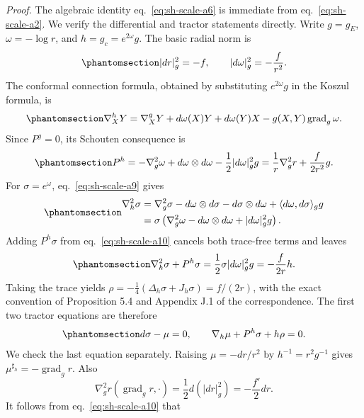 \documentclass[
  english,
  11pt,
  reqno]{amsart}
\begin{document}
\emph{Proof.} The algebraic identity eq.~\ref{eq:sh-scale-a6} is
immediate from eq.~\ref{eq:sh-scale-a2}. We verify the differential and
tractor statements directly. Write \(g=g_E\), \(\omega=-\log r\), and
\(h=g_c=e^{2\omega}g\). The basic radial norm is
\begin{equation}\protect\phantomsection\label{eq:sh-scale-a8}{
|dr|_g^2=-f,\qquad |d\omega|_g^2=-\frac f{r^2}.
}\end{equation} The conformal connection formula, obtained by
substituting \(e^{2\omega}g\) in the Koszul formula, is
\begin{equation}\protect\phantomsection\label{eq:sh-scale-a9}{
\nabla^h_XY=\nabla^g_XY+d\omega(X)Y+d\omega(Y)X
-g(X,Y)\operatorname{grad}_g\omega.
}\end{equation} Since \(P^g=0\), its Schouten consequence is
\begin{equation}\protect\phantomsection\label{eq:sh-scale-a10}{
P^h=-\nabla_g^2\omega+d\omega\otimes d\omega
-\frac12|d\omega|_g^2g
=\frac1r\nabla_g^2r+\frac f{2r^2}g.
}\end{equation} For \(\sigma=e^\omega\), eq.~\ref{eq:sh-scale-a9} gives
\begin{equation}\protect\phantomsection\label{eq:sh-scale-a11}{
\begin{aligned}
\nabla_h^2\sigma
&=\nabla_g^2\sigma-d\omega\otimes d\sigma-d\sigma\otimes d\omega
+\langle d\omega,d\sigma\rangle_g g\\
&=\sigma\left(\nabla_g^2\omega-d\omega\otimes d\omega
+|d\omega|_g^2g\right).
\end{aligned}
}\end{equation} Adding \(P^h\sigma\) from eq.~\ref{eq:sh-scale-a10}
cancels both trace-free terms and leaves
\begin{equation}\protect\phantomsection\label{eq:sh-scale-a12}{
\nabla_h^2\sigma+P^h\sigma
=\frac12\sigma|d\omega|_g^2g
=-\frac f{2r}h.
}\end{equation} Taking the trace yields
\(\rho=-\frac14(\Delta_h\sigma+J_h\sigma)=f/(2r)\), with the exact
convention of Proposition 5.4 and Appendix J.1 of the correspondence.
The first two tractor equations are therefore
\begin{equation}\protect\phantomsection\label{eq:sh-scale-a13}{
d\sigma-\mu=0,\qquad
\nabla_h\mu+P^h\sigma+h\rho=0.
}\end{equation} We check the last equation separately. Raising
\(\mu=-dr/r^2\) by \(h^{-1}=r^2g^{-1}\) gives
\(\mu^{\sharp_h}=-\operatorname{grad}_g r\). Also \[
\nabla_g^2r(\operatorname{grad}_g r,\cdot)
=\frac12d(|dr|_g^2)=-\frac{f'}2dr.
\] It follows from eq.~\ref{eq:sh-scale-a10} that
\end{document}
